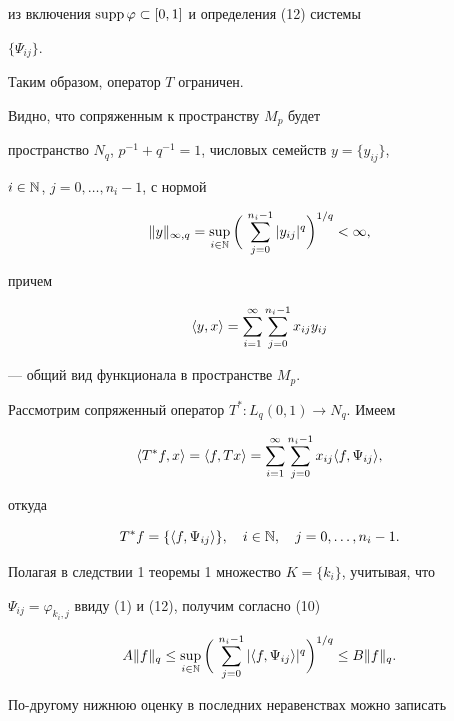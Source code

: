 из включения $\operatorname{supp}\varphi\subset[0,1]$ и определения (12) системы 


$\{\Psi_{ij}\}$. 


Таким образом, оператор $T$ ограничен. 


 


Видно, что сопряженным к пространству $M_p$ будет 


пространство $N_q$, $p^{-1}+q^{-1}=1$, числовых семейств $y=\{y_{ij}\}$, 


$i\in\Bbb N$, $j=0,\dotsc,n_i-1$, с нормой 


$$ 


\|y\|_{\infty,q}=\sup_{i\in\Bbb N}\bigg(\, 


\sum^{n_i-1}_{j=0}|y_{ij}|^q\bigg)^{1/q}<\infty, 


$$ 


причем 


$$ 


\la y,x\ra=\sum^\infty_{i=1}\sum^{n_i-1}_{j=0} 


x_{ij}y_{ij} 


$$ 


--- общий вид функционала в пространстве $M_p$. 


 


Рассмотрим сопряженный оператор $T^*:L_q(0,1)\to N_q$. Имеем 


$$ 


\la T^*f,x\ra=\la f, T x\ra=\sum^\infty_{i=1} 


\sum^{n_i-1}_{j=0}x_{ij}\la f,\Psi_{ij}\ra, 


$$ 


откуда 


$$ 


T^*f=\{\la f,\Psi_{ij}\ra\},\quad i\in\Bbb N,\quad 


j=0,\dotsc,n_i-1. 


$$ 


Полагая в следствии 1 теоремы 1 множество $K=\{k_i\}$, учитывая, что 


$\Psi_{ij}=\varphi_{k_i,j}$ ввиду (1) и (12), получим согласно (10) 


$$ 


A\|f\|_q\le\sup_{i\in\Bbb N}\bigg(\, 


\sum^{n_i-1}_{j=0}|\la f,\Psi_{ij}\ra|^q 


\bigg)^{1/q}\le B\|f\|_q. 


$$ 


По-другому нижнюю оценку в последних неравенствах можно записать 


